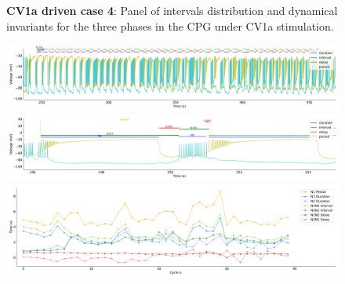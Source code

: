 \begin{figure}[htbp]
\begin{minipage}{0.9\textwidth}
\begin{minipage}[b]{0.53\textwidth}
\begin{minipage}[b]{\textwidth}
			\end{minipage}
		\end{minipage}
	\end{minipage}
	\caption{\textbf{CV1a driven case 4}: Panel of intervals distribution and dynamical invariants for the three phases in the CPG under CV1a stimulation.}
	\label{fig:cv1a 4 3phases}
\end{figure}

\begin{figure}[htbp]
	\centering
	\begin{minipage}[b]{\textwidth}
		\centering
		\includegraphics[width=\textwidth,height=0.1\textheight]{./invariants/data/SUSSEX/CV1a_driven4/images/stim_cv1a4_signal_intervals_zoom.pdf}
		\includegraphics[width=\textwidth]{./invariants/data/SUSSEX/CV1a_driven4/images/stim_cv1a4_signal_intervals_cycle.pdf}
		\includegraphics[width=\textwidth]{./invariants/data/SUSSEX/CV1a_driven4/images/stim_cv1a4_time_cycle.pdf}
	\end{minipage}
	\begin{minipage}{0.85\textwidth}
		\centering
		\begin{minipage}[b]{0.43\textwidth}
			\centering

\end{minipage}
\end{minipage}
\end{figure}
